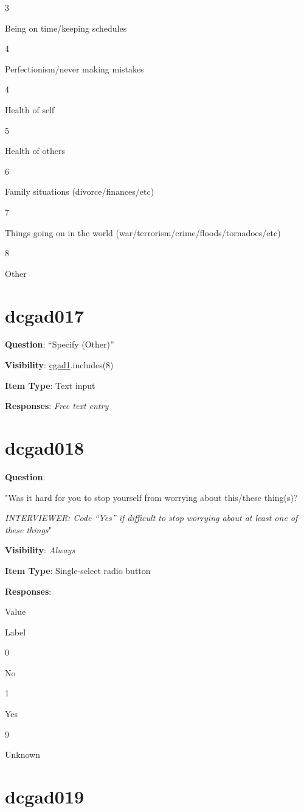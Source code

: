 \documentclass[]{book}
\begin{document}
3

Being on time/keeping schedules

4

Perfectionism/never making mistakes

4

Health of self

5

Health of others

6

Family situations (divorce/finances/etc)

7

Things going on in the world (war/terrorism/crime/floods/tornadoes/etc)

8

Other

\hypertarget{dcgad017}{%
\section{dcgad017}\label{dcgad017}}

\textbf{Question}: ``Specify (Other)''

\textbf{Visibility}: \protect\hyperlink{cgad1}{cgad1}.includes(8)

\textbf{Item Type}: Text input

\textbf{Responses}: \emph{Free text entry}

\hypertarget{dcgad018}{%
\section{dcgad018}\label{dcgad018}}

\textbf{Question}:

"Was it hard for you to stop yourself from worrying about this/these thing(s)?

\emph{INTERVIEWER: Code ``Yes'' if difficult to stop worrying about at least one of these things}"

\textbf{Visibility}: \emph{Always}

\textbf{Item Type}: Single-select radio button

\textbf{Responses}:

Value

Label

0

No

1

Yes

9

Unknown

\hypertarget{dcgad019}{%
\section{dcgad019}\label{dcgad019}}
\end{document}
